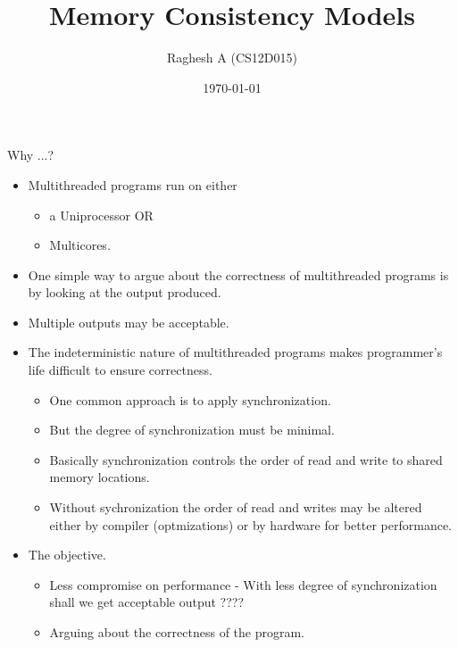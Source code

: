 \documentclass[9pt]{beamer}
\title{\Large{Memory Consistency Models}}
\author[Raghesh A]{\Large{Raghesh A }(CS12D015)\newline\newline
}
\institute{PACE Lab, Department of CSE, IIT Madras}
\date{\today}
\begin{document}
\begin{frame}
\titlepage
\end{frame}

\begin{frame}{Why ...?}
\begin{itemize}
\item Multithreaded programs run on either
  \begin{itemize}
  \item a Uniprocessor \pause OR
  \item Multicores.
  \end{itemize}
\pause
\item One simple way to argue about the correctness of multithreaded programs
      is by looking at the output produced.
\pause
\item Multiple outputs may be acceptable.
\pause
\item The indeterministic nature of multithreaded programs makes programmer's
      life difficult to ensure correctness.
\pause
  \begin{itemize}
  \item One common approach is to apply synchronization.
  \item But the degree of synchronization must be minimal.
  \item Basically synchronization controls the order of read and write to
        shared memory locations.
  \item Without sychronization the order of read and writes may be altered either
        by compiler (optmizations) or by hardware for better performance.
  \end{itemize}
\pause
\item The objective.
  \begin{itemize}
  \item Less compromise on performance - With less degree of synchronization 
  shall we get acceptable output ????
  \item Arguing about the correctness of the program.
  \end{itemize}

\end{itemize}
\end{frame}
\end{document}
